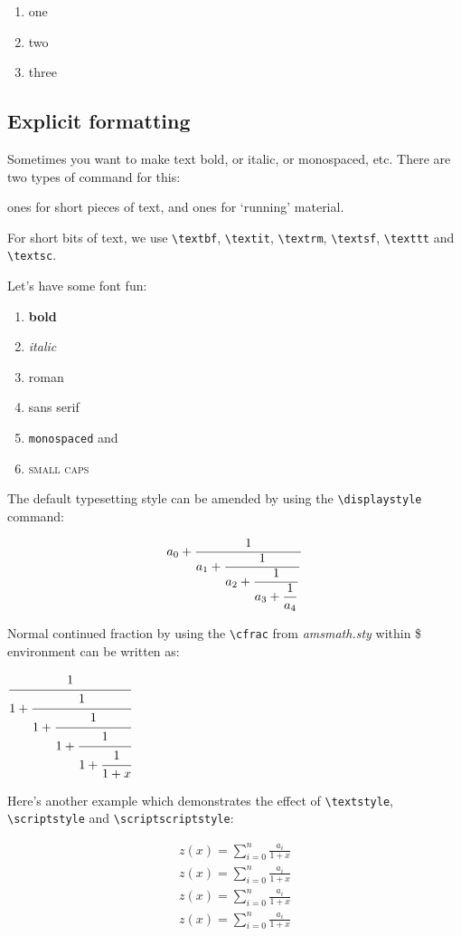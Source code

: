 \documentclass[12]{article}
\begin{document}
    \renewcommand{\labelenumi}{\roman{enumi}}
    \begin{enumerate}
    \item one
    \item two
    \item three
    \end{enumerate}

    \subsection{Explicit formatting}%
    \label{sub:formatting}
    
    Sometimes you want to make text bold, or italic, or monospaced, etc. There are two types of command for this:

    ones for short pieces of text, and ones for ‘running’ material.

    For short bits of text, we use \verb|\textbf|, \verb|\textit|, \verb|\textrm|, \verb|\textsf|, \verb|\texttt| and \verb|\textsc|.

    Let's have some font fun:

    \begin{enumerate}
        \item \textbf{bold}
        \item \textit{italic}
        \item \textrm{roman}
        \item \textsf{sans serif}
        \item \texttt{monospaced} and
        \item \textsc{small caps}
    \end{enumerate}

    The default typesetting style can be amended by using the \verb|\displaystyle| command:

    \[
    a_0+{1\over\displaystyle a_1+
          {1\over\displaystyle a_2+
            {1 \over\displaystyle a_3 + 
               {1 \over\displaystyle a_4}}}}
    \]


    Normal continued fraction by using the \verb|\cfrac| from \textit{amsmath.sty} within \$ environment can be written as:

    $\cfrac{1}{1+\cfrac{1}{1+\cfrac{1}{1+\cfrac{1}{1 + \cfrac{1}{1 + x}}}}}$


    Here’s another example which demonstrates the effect of \verb|\textstyle|, \verb|\scriptstyle| and \verb|\scriptscriptstyle|:

        \begin{eqnarray*}
        z(x) = \sum_{i=0}^{n} \frac{a_i}{1+x} \\
        \textstyle z(x) = \textstyle \sum_{i=0}^{n} \frac{a_i}{1+x} \\
        \scriptstyle z(x) = \scriptstyle \sum_{i=0}^{n} \frac{a_i}{1+x} \\
        \scriptscriptstyle z(x) = \scriptscriptstyle \sum_{i=0}^{n} \frac{a_i}{1+x}
        \end{eqnarray*}
\end{document}
